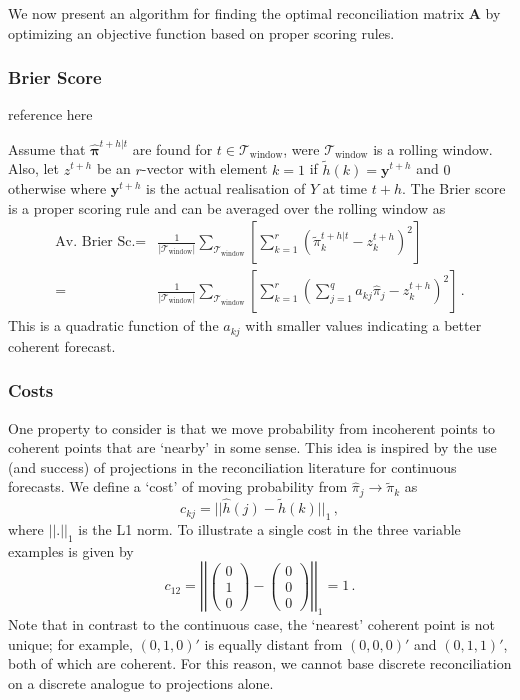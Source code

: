 \documentclass[a4paper,review,12pt,authoryear]{elsarticle}
\newcommand{\bpi}{\bm{\pi}}
\begin{document}
      We now present an algorithm for finding the optimal reconciliation matrix $\mathbf{A}$ by optimizing an objective function based on proper scoring rules.
      
      \subsubsection*{\textbf{Brier Score}}
      
      {\color{red} reference here}

      Assume that $\hat{\bpi}^{t+h|t}$ are found for $t\in\mathcal{T}_{\textrm{window}}$, were $\mathcal{T}_{\textrm{window}}$ is a rolling window. Also, let $z^{t+h}$ be an $r$-vector with element $k=1$ if $\tilde{h}(k)=\bm{y}^{t+h}$ and $0$ otherwise where $\bm{y}^{t+h}$ is the actual realisation of $Y$ at time $t+h$. The Brier score is a proper scoring rule and can be averaged over the rolling window as
      \begin{align*}
      \textrm{Av. Brier Sc.}=&\frac{1}{|\mathcal{T}_{\textrm{window}}|}\sum\limits_{\mathcal{T}_{\textrm{window}}}\left[\sum\limits_{k=1}^r\left(\tilde{\pi}_k^{t+h|t}-z^{t+h}_k\right)^2\right]\\
      =&\frac{1}{|\mathcal{T}_{\textrm{window}}|}\sum\limits_{\mathcal{T}_{\textrm{window}}}\left[\sum\limits_{k=1}^r\left(\sum\limits_{j=1}^q a_{kj}\hat{{\pi}}_j-z^{t+h}_k\right)^2\right]\,.
      \end{align*}
      This is a quadratic function of the $a_{kj}$ with smaller values indicating a better coherent forecast.
      \label{sec:optimisation}
      \subsubsection*{\textbf{Costs}}
      One property to consider is that we move probability from incoherent points to coherent points that are  `nearby' in some sense. 
      This idea is inspired by the use (and success) of projections in the reconciliation literature for continuous forecasts. 
      We define a `cost' of moving probability from $\hat{\pi}_j\rightarrow\tilde{\pi}_k$ as
      \[
      c_{kj}=||\hat{h}(j)-\tilde{h}(k)||_1\,,
      \]
      where $||.||_1$ is the L1 norm. To illustrate a single cost in the three variable examples is given by
      \[
      c_{12}=\left|\left|\begin{pmatrix}0\\1\\0\end{pmatrix}-\begin{pmatrix}0\\0\\0\end{pmatrix}\right|\right|_1=1\,.
      \]
      Note that in contrast to the continuous case, the `nearest' coherent point is not unique; for example, $(0,1,0)'$ is equally distant from $(0,0,0)'$ and $(0,1,1)'$, both of which are coherent. For this reason, we cannot base discrete reconciliation on a discrete analogue to projections alone.
\end{document}
